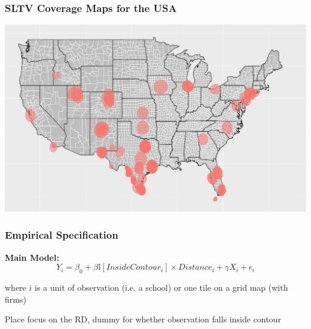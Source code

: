 \documentclass{beamer}
\begin{document}
\begin{frame}
\frametitle{SLTV Coverage Maps for the USA}
\centering
        \includegraphics[width=1\textwidth]{../../analysis/Output/img/SpanishContours_pretty.pdf}\\
\end{frame}


\begin{frame}
\frametitle{Empirical Specification}

\textbf{Main Model:}
\[ Y_i^{} = \beta_0 + \beta \mathbb{I}[InsideContour_i] \times Distance_i + \gamma X_i + \epsilon_i \]

%
%

where $i$ is a unit of observation (i.e. a school) or one tile on a grid map (with firms)

\vspace{15pt}

Place focus on the RD, dummy for whether observation falls inside contour

\end{frame}



\end{document}
